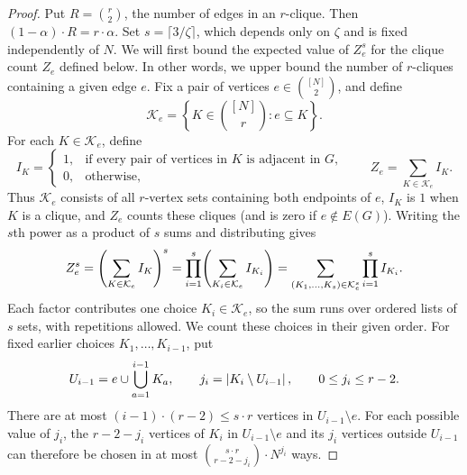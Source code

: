 \begin{proof}
    Put $R=\binom r2$, the number of edges in an $r$-clique. Then $(1-\alpha)\cdot R=r\cdot\alpha$. Set $s=\lceil3/\zeta\rceil$, which depends only on $\zeta$ and is fixed independently of $N$.
    We will first bound the expected value of $Z_e^s$ for the clique count $Z_e$ defined below.
    In other words, we upper bound the number of $r$-cliques containing a given edge $e$.
    Fix a pair of vertices $e\in\binom{[N]}{2}$, and define
    \[
        \mathcal{K}_e=\left\{K\in\binom{[N]}{r}\colon e\subseteq K\right\}.
    \]
    For each $K\in\mathcal K_e$, define
    \[
        I_K=\begin{cases}
            1,&\text{if every pair of vertices in }K\text{ is adjacent in }G,\\
            0,&\text{otherwise},
        \end{cases}
        \qquad Z_e=\sum_{K\in\mathcal K_e}I_K.
    \]
    Thus $\mathcal K_e$ consists of all $r$-vertex sets containing both endpoints of $e$, $I_K$ is $1$ when $K$ is a clique, and $Z_e$ counts these cliques (and is zero if $e\notin E(G)$). Writing the $s$th power as a product of $s$ sums and distributing gives
    \[
        Z_e^s
        =\mathopen{}\left( \sum_{K\in\mathcal K_e}I_K \right)^s
        =\prod_{i=1}^s\mathopen{}\left( \sum_{K_i\in\mathcal K_e}I_{K_i} \right)
        =\sum_{(K_1,\ldots,K_s)\in\mathcal K_e^s}
        \prod_{i=1}^s I_{K_i}.
    \]
    Each factor contributes one choice $K_i\in\mathcal K_e$, so the sum runs over ordered lists of $s$ sets, with repetitions allowed. We count these choices in their given order. For fixed earlier choices $K_1,\ldots,K_{i-1}$, put
    \[
        U_{i-1}=e\cup\bigcup_{a=1}^{i-1}K_a,\qquad
        j_i=\mathopen{}\left| K_i\setminus U_{i-1} \right|,\qquad 0\leq j_i\leq r-2.
    \]
    There are at most $(i-1)\cdot(r-2)\leq s\cdot r$ vertices in $U_{i-1}\setminus e$. For each possible value of $j_i$, the $r-2-j_i$ vertices of $K_i$ in $U_{i-1}\setminus e$ and its $j_i$ vertices outside $U_{i-1}$ can therefore be chosen in at most $\binom{s\cdot r}{r-2-j_i}\cdot N^{j_i}$ ways.


\end{proof}
